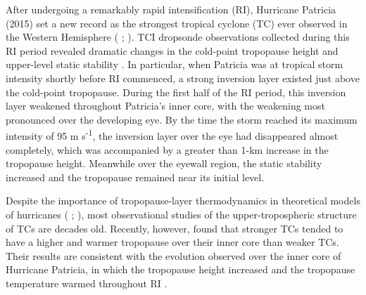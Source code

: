 \documentclass{ametsoc}
\begin{document}
After undergoing a remarkably rapid intensification (RI), Hurricane Patricia (2015) set a new record as the strongest tropical cyclone (TC) ever observed in the Western Hemisphere (\citeauthor{Kimberlainetal2016} \citeyear{Kimberlainetal2016}; \citeauthor{Rogersetal2017} \citeyear{Rogersetal2017}).
TCI dropsonde observations collected during this RI period revealed dramatic changes in the cold-point tropopause height and upper-level static stability \citep{DuranMolinari2018}.
In particular, when Patricia was at tropical storm intensity shortly before RI commenced, a strong inversion layer existed just above the cold-point tropopause.
During the first half of the RI period, this inversion layer weakened throughout Patricia's inner core, with the weakening most pronounced over the developing eye.
By the time the storm reached its maximum intensity of 95 m s\textsuperscript{-1}, the inversion layer over the eye had disappeared almost completely, which was accompanied by a greater than 1-km increase in the tropopause height.
Meanwhile over the eyewall region, the static stability increased and the tropopause remained near its initial level.

Despite the importance of tropopause-layer thermodynamics in theoretical models of hurricanes (\citeauthor{EmanuelRotunno2011} \citeyear{EmanuelRotunno2011}; \citeauthor{Emanuel2012} \citeyear{Emanuel2012}), most observational studies of the upper-tropospheric structure of TCs are decades old.
Recently, however, \cite{KomaromiDoyle2017} found that stronger TCs tended to have a higher and warmer tropopause over their inner core than weaker TCs.
Their results are consistent with the evolution observed over the inner core of Hurricane Patricia, in which the tropopause height increased and the tropopause temperature warmed throughout RI \citep{DuranMolinari2018}.
\end{document}
